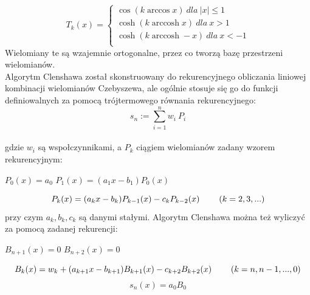 \documentclass{article}
\DeclareMathOperator{\arccosh}{arccosh}
\begin{document}
\begin{equation} 
    T_{k}(x)=\left\{
                \begin{array}{ll}
                  \cos(k \arccos x) \ dla \  |x| \leqslant 1\\
                  \cosh(k \arccosh x) \ dla \  x > 1\\
                  \cosh(k \arccosh -x) \ dla \  x < -1\\
                \end{array}
              \right.
\end{equation}
Wielomiany te są wzajemnie ortogonalne, przez co tworzą bazę przestrzeni wielomianów.\\
\indent Algorytm Clenshawa został skonstruowany do rekurencyjnego obliczania liniowej kombinacji wielomianów Czebyszewa, ale ogólnie stosuje się go do funkcji definiowalnych za pomocą trójtermowego równania rekurencyjnego:
$$s_n := \sum_{i=1}^{n} w_i\ P_i$$\\ 
gdzie $w_i$ są wspołczynnikami, a $P_k$ ciągiem wielomianów zadany wzorem rekurencyjnym:
{\begin{center}
$P_0(x) = a_0$\hspace{0.6cm}
$P_1(x) = (a_1x-b_1)P_0(x)$\\
\end{center}}
\begin{equation}
    P_{k}(x)=(a_kx-b_k)P_{k-1}(x)-c_kP_{k-2}(x) \hspace{0,8cm} (k = 2,3,...)\\
\end{equation}
przy czym $a_k, b_k, c_k$ są danymi stałymi. 
\newpage
Algorytm Clenshawa można też wyliczyć za pomocą zadanej rekurencji:\\
{\begin{center}
    $B_{n+1}(x) = 0$\hspace{0.6cm}
    $B_{n+2}(x) = 0$\\
\end{center}}
\begin{equation}
    B_{k}(x)=w_k+(a_{k+1}x-b_{k+1})B_{k+1}(x)-c_{k+2}B_{k+2}(x) \hspace{0,8cm} (k = n,n-1,...,0)\\
\end{equation}
\begin{equation*}
    s_n(x)=a_0B_0
\end{equation*}
\end{document}
